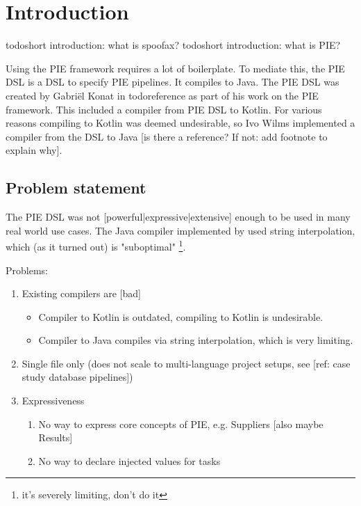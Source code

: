 
\chapter{\label{chap:introduction}Introduction}

todo{short introduction: what is spoofax?}
todo{short introduction: what is PIE?}

Using the PIE framework requires a lot of boilerplate.
To mediate this, the PIE DSL is a DSL to specify PIE pipelines.
It compiles to Java.
The PIE DSL was created by Gabriël Konat in todo{reference} as part of his work on the PIE framework.
This included a compiler from PIE DSL to Kotlin.
For various reasons compiling to Kotlin was deemed undesirable, so Ivo Wilms implemented a compiler from the DSL to Java [is there a reference? If not: add footnote to explain why].

\section{\label{sec:introduction__problem_statement}Problem statement}
The PIE DSL was not [powerful|expressive|extensive] enough to be used in many real world use cases.
The Java compiler implemented by used string interpolation, which (as it turned out) is "suboptimal" \footnote{it's severely limiting, don't do it}.

Problems:
\begin{enumerate}
  \item Existing compilers are [bad]
  \begin{itemize}
     \item Compiler to Kotlin is outdated, compiling to Kotlin is undesirable.
     \item Compiler to Java compiles via string interpolation, which is very limiting.
   \end{itemize}
  \item Single file only (does not scale to multi-language project setups, see [ref: case study database pipelines])
  \item Expressiveness
  \begin{enumerate}
    \item No way to express core concepts of PIE, e.g. Suppliers [also maybe Results]
    \item No way to declare injected values for tasks
  \end{enumerate}
\end{enumerate}

